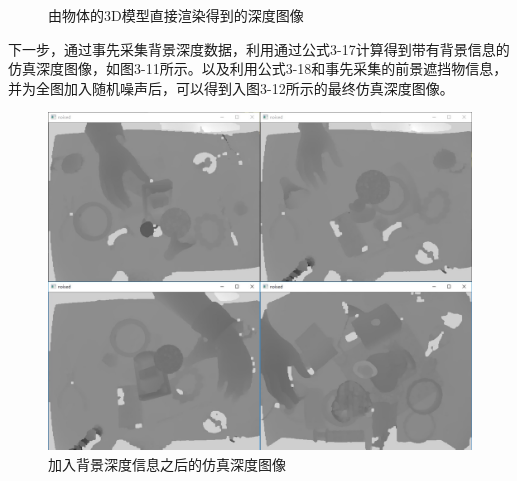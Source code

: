 \begin{figure}[htb]
{\begin{minipage}[b]{0.5\textwidth}
		\end{minipage}}
	\caption{由物体的3D模型直接渲染得到的深度图像} 
\end{figure}

下一步，通过事先采集背景深度数据，利用通过公式3-17计算得到带有背景信息的仿真深度图像，如图3-11所示。以及利用公式3-18和事先采集的前景遮挡物信息，并为全图加入随机噪声后，可以得到入图3-12所示的最终仿真深度图像。

\begin{figure}[htb]
	\centering 
	\includegraphics[scale=0.22]{./mypic/加入背景深度信息之后的仿真深度图像.jpg} 
	\caption{加入背景深度信息之后的仿真深度图像} 
\end{figure}

